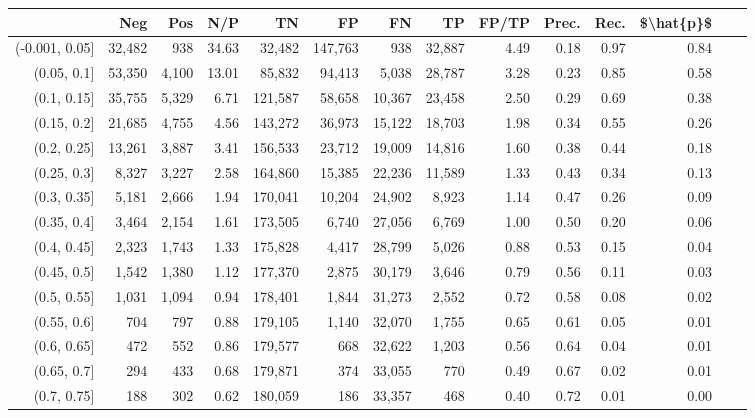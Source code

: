 \begin{tabular}{rrrrrrrrrrrrrr}
\toprule
{} &     Neg &    Pos &    N/P &       TN &       FP &      FN &      TP & FP/TP & Prec. &  Rec. & \$\textbackslash hat\{p\}\$ \\
\midrule
(-0.001, 0.05] &  32,482 &    938 &  34.63 &   32,482 &  147,763 &     938 &  32,887 &  4.49 &  0.18 &  0.97 &      0.84 \\
(0.05, 0.1]    &  53,350 &  4,100 &  13.01 &   85,832 &   94,413 &   5,038 &  28,787 &  3.28 &  0.23 &  0.85 &      0.58 \\
(0.1, 0.15]    &  35,755 &  5,329 &   6.71 &  121,587 &   58,658 &  10,367 &  23,458 &  2.50 &  0.29 &  0.69 &      0.38 \\
(0.15, 0.2]    &  21,685 &  4,755 &   4.56 &  143,272 &   36,973 &  15,122 &  18,703 &  1.98 &  0.34 &  0.55 &      0.26 \\
(0.2, 0.25]    &  13,261 &  3,887 &   3.41 &  156,533 &   23,712 &  19,009 &  14,816 &  1.60 &  0.38 &  0.44 &      0.18 \\
(0.25, 0.3]    &   8,327 &  3,227 &   2.58 &  164,860 &   15,385 &  22,236 &  11,589 &  1.33 &  0.43 &  0.34 &      0.13 \\
(0.3, 0.35]    &   5,181 &  2,666 &   1.94 &  170,041 &   10,204 &  24,902 &   8,923 &  1.14 &  0.47 &  0.26 &      0.09 \\
(0.35, 0.4]    &   3,464 &  2,154 &   1.61 &  173,505 &    6,740 &  27,056 &   6,769 &  1.00 &  0.50 &  0.20 &      0.06 \\
(0.4, 0.45]    &   2,323 &  1,743 &   1.33 &  175,828 &    4,417 &  28,799 &   5,026 &  0.88 &  0.53 &  0.15 &      0.04 \\
(0.45, 0.5]    &   1,542 &  1,380 &   1.12 &  177,370 &    2,875 &  30,179 &   3,646 &  0.79 &  0.56 &  0.11 &      0.03 \\
(0.5, 0.55]    &   1,031 &  1,094 &   0.94 &  178,401 &    1,844 &  31,273 &   2,552 &  0.72 &  0.58 &  0.08 &      0.02 \\
(0.55, 0.6]    &     704 &    797 &   0.88 &  179,105 &    1,140 &  32,070 &   1,755 &  0.65 &  0.61 &  0.05 &      0.01 \\
(0.6, 0.65]    &     472 &    552 &   0.86 &  179,577 &      668 &  32,622 &   1,203 &  0.56 &  0.64 &  0.04 &      0.01 \\
(0.65, 0.7]    &     294 &    433 &   0.68 &  179,871 &      374 &  33,055 &     770 &  0.49 &  0.67 &  0.02 &      0.01 \\
(0.7, 0.75]    &     188 &    302 &   0.62 &  180,059 &      186 &  33,357 &     468 &  0.40 &  0.72 &  0.01 &      0.00 \\

\end{tabular}
